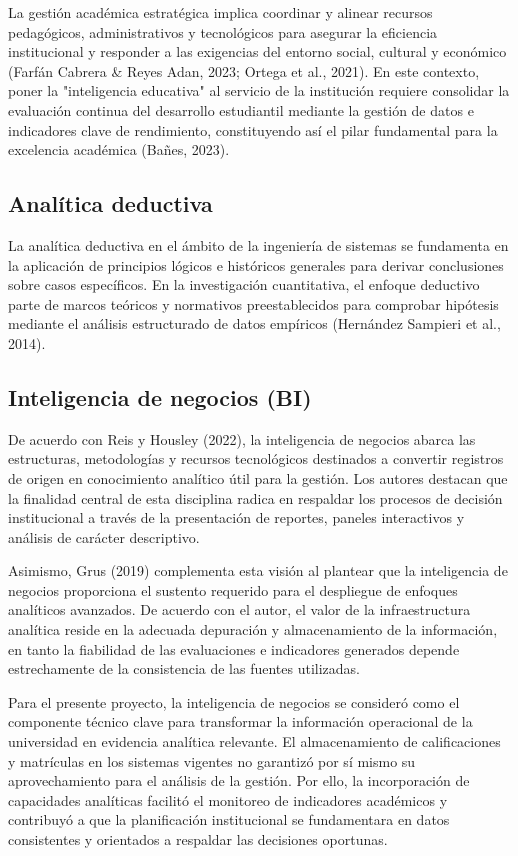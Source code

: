 \documentclass[11pt,oneside,openany]{book}
\begin{document}
La gestión académica estratégica implica coordinar y alinear recursos pedagógicos, administrativos y tecnológicos para asegurar la eficiencia institucional y responder a las exigencias del entorno social, cultural y económico (Farfán Cabrera \& Reyes Adan, 2023; Ortega et al., 2021). En este contexto, poner la "inteligencia educativa" al servicio de la institución requiere consolidar la evaluación continua del desarrollo estudiantil mediante la gestión de datos e indicadores clave de rendimiento, constituyendo así el pilar fundamental para la excelencia académica (Bañes, 2023).

\subsection{Analítica deductiva}

La analítica deductiva en el ámbito de la ingeniería de sistemas se fundamenta en la aplicación de principios lógicos e históricos generales para derivar conclusiones sobre casos específicos. En la investigación cuantitativa, el enfoque deductivo parte de marcos teóricos y normativos preestablecidos para comprobar hipótesis mediante el análisis estructurado de datos empíricos (Hernández Sampieri et al., 2014).

\subsection{Inteligencia de negocios (BI)}

De acuerdo con Reis y Housley (2022), la inteligencia de negocios abarca las estructuras, metodologías y recursos tecnológicos destinados a convertir registros de origen en conocimiento analítico útil para la gestión. Los autores destacan que la finalidad central de esta disciplina radica en respaldar los procesos de decisión institucional a través de la presentación de reportes, paneles interactivos y análisis de carácter descriptivo.

Asimismo, Grus (2019) complementa esta visión al plantear que la inteligencia de negocios proporciona el sustento requerido para el despliegue de enfoques analíticos avanzados. De acuerdo con el autor, el valor de la infraestructura analítica reside en la adecuada depuración y almacenamiento de la información, en tanto la fiabilidad de las evaluaciones e indicadores generados depende estrechamente de la consistencia de las fuentes utilizadas.

Para el presente proyecto, la inteligencia de negocios se consideró como el componente técnico clave para transformar la información operacional de la universidad en evidencia analítica relevante. El almacenamiento de calificaciones y matrículas en los sistemas vigentes no garantizó por sí mismo su aprovechamiento para el análisis de la gestión. Por ello, la incorporación de capacidades analíticas facilitó el monitoreo de indicadores académicos y contribuyó a que la planificación institucional se fundamentara en datos consistentes y orientados a respaldar las decisiones oportunas.
\end{document}
